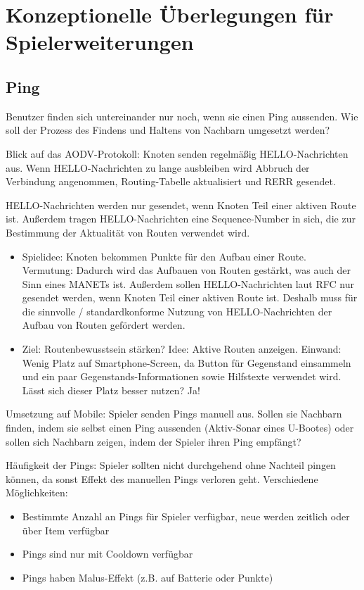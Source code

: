 ﻿\section{Konzeptionelle Überlegungen für Spielerweiterungen}

\subsection{Ping}
Benutzer finden sich untereinander nur noch, wenn sie einen Ping aussenden. Wie soll der Prozess des Findens und Haltens von Nachbarn umgesetzt werden?

Blick auf das AODV-Protokoll: Knoten senden regelmäßig HELLO-Nachrichten aus. Wenn HELLO-Nachrichten zu lange ausbleiben wird Abbruch der Verbindung angenommen, Routing-Tabelle aktualisiert und RERR gesendet.

HELLO-Nachrichten werden nur gesendet, wenn Knoten Teil einer aktiven Route ist. Außerdem tragen HELLO-Nachrichten eine Sequence-Number in sich, die zur Bestimmung der Aktualität von Routen verwendet wird.

\begin{itemize}
	\item Spielidee: Knoten bekommen Punkte für den Aufbau einer Route. Vermutung: Dadurch wird das Aufbauen von Routen gestärkt, was auch der Sinn eines MANETs ist. Außerdem sollen HELLO-Nachrichten laut RFC nur gesendet werden, wenn Knoten Teil einer aktiven Route ist. Deshalb muss für die sinnvolle / standardkonforme Nutzung von HELLO-Nachrichten der Aufbau von Routen gefördert werden.
	\item Ziel: Routenbewusstsein stärken? Idee: Aktive Routen anzeigen. Einwand: Wenig Platz auf Smartphone-Screen, da Button für Gegenstand einsammeln und ein paar Gegenstands-Informationen sowie Hilfstexte verwendet wird. Lässt sich dieser Platz besser nutzen? Ja!
\end{itemize}

Umsetzung auf Mobile: Spieler senden Pings manuell aus. Sollen sie Nachbarn finden, indem sie selbst einen Ping aussenden (Aktiv-Sonar eines U-Bootes) oder sollen sich Nachbarn zeigen, indem der Spieler ihren Ping empfängt?

Häufigkeit der Pings: Spieler sollten nicht durchgehend ohne Nachteil pingen können, da sonst Effekt des manuellen Pings verloren geht. Verschiedene Möglichkeiten:

\begin{itemize}
	\item Bestimmte Anzahl an Pings für Spieler verfügbar, neue werden zeitlich oder über Item verfügbar
	\item Pings sind nur mit Cooldown verfügbar
	\item Pings haben Malus-Effekt (z.B. auf Batterie oder Punkte)
\end{itemize}

